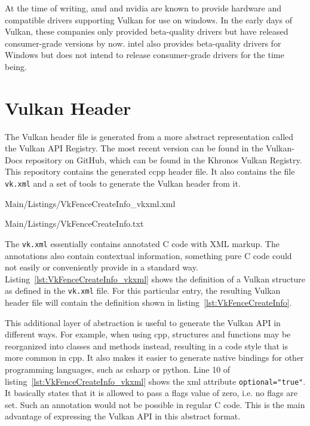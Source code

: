 
    At the time of writing, \gls{amd} and \gls{nvidia} are known to provide hardware and compatible drivers supporting Vulkan for use on \gls{windows}.
    In the early days of Vulkan, these companies only provided beta-quality \glspl{driver} but have released consumer-grade versions by now.
    \gls{intel} also provides beta-quality drivers for Windows but does not intend to release consumer-grade \glspl{driver} for the time being\cite{intelvulkandriversonwindows}.

  \section{Vulkan Header}
  \label{sec:VulkanHeader}
    The Vulkan header file is generated from a more abstract representation called the Vulkan API Registry.
    The most recent version can be found in the Vulkan-Docs repository on GitHub, which can be found in the Khronos Vulkan Registry\cite{vulkanregistry}.
    This repository contains the generated \gls{ccpp} header file.
    It also contains the file \lstinline{vk.xml} and a set of tools to generate the Vulkan header from it.

    
    {Main/Listings/VkFenceCreateInfo_vkxml.xml}

    
    {Main/Listings/VkFenceCreateInfo.txt}

    The \lstinline{vk.xml} essentially contains annotated C code with XML markup.
    The annotations also contain contextual information, something pure C code could not easily or conveniently provide in a standard way.
    Listing~\ref{lst:VkFenceCreateInfo_vkxml} shows the definition of a Vulkan structure as defined in the \lstinline{vk.xml} file.
    For this particular entry, the resulting Vulkan header file will contain the definition shown in listing~\ref{lst:VkFenceCreateInfo}.

    This additional layer of abstraction is useful to generate the Vulkan API in different ways.
    For example, when using \gls{cpp}, structures and functions may be reorganized into classes and methods instead, resulting in a code style that is more common in \gls{cpp}.
    It also makes it easier to generate native bindings for other programming languages, such as \gls{csharp} or \gls{python}.
    Line 10 of listing~\ref{lst:VkFenceCreateInfo_vkxml} shows the xml attribute \lstinline{optional="true"}.
    It basically states that it is allowed to pass a flags value of zero, i.e. no flags are set.
    Such an annotation would not be possible in regular C code.
    This is the main advantage of expressing the Vulkan API in this abstract format.


